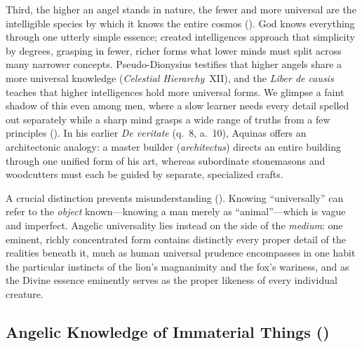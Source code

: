 Third, the higher an angel stands in nature, the fewer and more universal are the intelligible species by which it knows the entire cosmos (). God knows everything through one utterly simple essence; created intelligences approach that simplicity by degrees, grasping in fewer, richer forms what lower minds must split across many narrower concepts. Pseudo-Dionysius testifies that higher angels share a more universal knowledge (\emph{Celestial Hierarchy}~XII), and the \emph{Liber de causis} teaches that higher intelligences hold more universal forms. We glimpse a faint shadow of this even among men, where a slow learner needs every detail spelled out separately while a sharp mind grasps a wide range of truths from a few principles (). In his earlier \emph{De veritate} (q.~8, a.~10), Aquinas offers an architectonic analogy: a master builder (\emph{architectus}) directs an entire building through one unified form of his art, whereas subordinate stonemasons and woodcutters must each be guided by separate, specialized crafts.

A crucial distinction prevents misunderstanding (). Knowing ``universally'' can refer to the \emph{object} known---knowing a man merely as ``animal''---which is vague and imperfect. Angelic universality lies instead on the side of the \emph{medium}: one eminent, richly concentrated form contains distinctly every proper detail of the realities beneath it, much as human universal prudence encompasses in one habit the particular instincts of the lion's magnanimity and the fox's wariness, and as the Divine essence eminently serves as the proper likeness of every individual creature.


\subsection{Angelic Knowledge of Immaterial Things ()}

